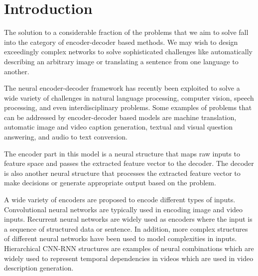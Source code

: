 \documentclass[preprint, 12pt]{elsarticle}
\begin{document}
\begin{frontmatter}
		\begin{keyword}
			
			
			
		\end{keyword}
		
	\end{frontmatter}
	

	
	\section{Introduction}
	The solution to a considerable fraction of the problems that we aim to solve fall into the category of encoder-decoder based methods. We may wish to design exceedingly complex networks to solve sophisticated challenges like automatically describing an arbitrary image or translating a sentence from one language to another. 
	
	The neural encoder-decoder framework has recently been exploited to solve a wide variety of challenges in natural language processing, computer vision, speech processing, and even interdisciplinary problems. Some examples of problems that can be addressed by encoder-decoder based models are machine translation, automatic image and video caption generation, textual and visual question answering, and audio to text conversion.
	
	The encoder part in this model is a neural structure that maps raw inputs to feature space and passes the extracted feature vector to the decoder. The decoder is also another neural structure that processes the extracted feature vector to make decisions or generate appropriate output based on the problem.
	
	A wide variety of encoders are proposed to encode different types of inputs. Convolutional neural networks are typically used in encoding image and video inputs. Recurrent neural networks are widely used as encoders where the input is a sequence of structured data or sentence. In addition, more complex structures of different neural networks have been used to model complexities in inputs. Hierarchical CNN-RNN structures are examples of neural combinations which are widely used to represent temporal dependencies in videos which are used in video description generation.
	
\end{document}
